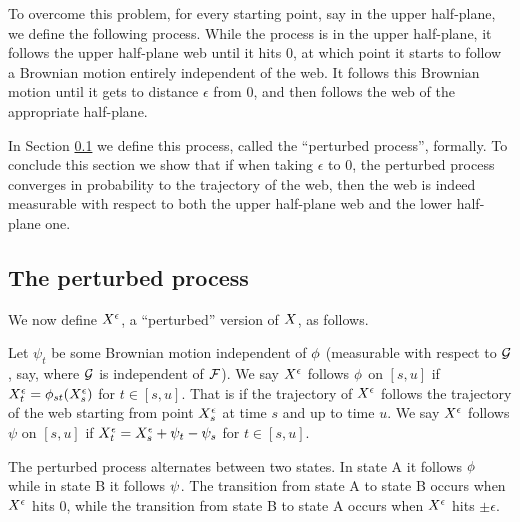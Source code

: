 {To overcome this problem, for every starting point, say in the upper
half-plane, we define the following process. While the process is in
the upper half-plane, it follows the upper half-plane web until it hits
$0$, at which point it starts to follow a Brownian motion entirely
independent of the web. It follows this Brownian motion until it gets
to distance $\epsilon$ from 0, and then follows the web of the appropriate
half-plane.

In Section \ref{subsec:the-perturbed-process} we define this process, called the
``perturbed process'', formally.
To conclude this section we show that if when taking $\epsilon$
to 0, the perturbed process converges in probability to the trajectory of
the web, then the web is indeed measurable with respect
to both the upper half-plane web and the lower half-plane one.

\subsection{The perturbed process}
\label{subsec:the-perturbed-process}

{
\newcommand{\joinernoargs}{\psi}
\newcommand{\joiner}[2]{\joinernoargs_{{#1}{#2}}}
\newcommand{\joinerval}[1]{\joinernoargs_{#1}}
\begin{definition}
  \label{def:resamplede}
  We now define $X^{\epsilon}$, a ``perturbed'' version of $X$, as
  follows.

  Let $\joinerval{t}$ be
  some Brownian motion independent of $\phi$ (measurable with
  respect to $\mathcal{G}$, say, where $\mathcal{G}$ is independent of
  $\mathcal{F}$).
  We say $X^{\epsilon}$ follows $\phi$ on $[s,u]$ if
  $X^{\epsilon}_t = \phi_{{s}{t}}(X^{\epsilon}_s)$ for $t \in [s,u]$.
  That is if the trajectory of $X^{\epsilon}$ follows the trajectory of
  the web starting from point $X^{\epsilon}_s$ at time $s$ and up to time $u$.
  We say $X^{\epsilon}$ follows $\joinernoargs$ on $[s,u]$ if
  $\resamplede_t = \resamplede_s + \joinerval{t} - \joinerval{s}$ for $t \in [s,u]$.

  The perturbed process alternates between two states.  In state A it follows
  $\phi$ while in state B it follows $\psi$.
  The transition from state A to state B occurs
  when $X^{\epsilon}$ hits $0$, while
  the transition from state B to state A occurs when
  $X^{\epsilon}$ hits $\pm \epsilon$.
\end{definition}
}

}
